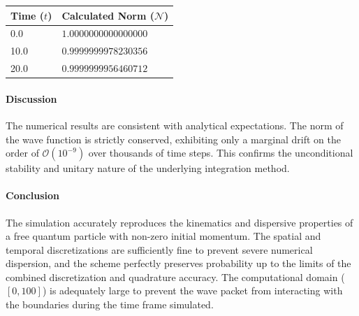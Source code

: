 \begin{solution}
	\begin{center}
		\centering
		\renewcommand{\arraystretch}{1.2}
		\begin{tabular}{ll}
			\toprule
			Time ($t$) & Calculated Norm ($\mathcal{N}$) \\
			\midrule
			0.0                 & $1.0000000000000000$                     \\
			10.0                & $0.9999999978230356$                     \\
			20.0                & $0.9999999956460712$                     \\
			\bottomrule
		\end{tabular}
		\label{tab:norm_moving}
	\end{center}

	\paragraph{Discussion}
	The numerical results are consistent with analytical expectations. The norm of
	the wave function is strictly conserved, exhibiting only a marginal drift on the
	order of $\mathcal{O}(10^{-9})$ over thousands of time steps. This confirms the
	unconditional stability and unitary nature of the underlying integration method.

	\paragraph{Conclusion}
	The simulation accurately reproduces the kinematics and dispersive properties
	of a free quantum particle with non-zero initial momentum. The spatial and
	temporal discretizations are sufficiently fine to prevent severe numerical
	dispersion, and the scheme perfectly preserves probability up to the limits of
	the combined discretization and quadrature accuracy. The computational domain
	($[0, 100]$) is adequately large to prevent the wave packet from interacting
	with the boundaries during the time frame simulated.
\end{solution}

